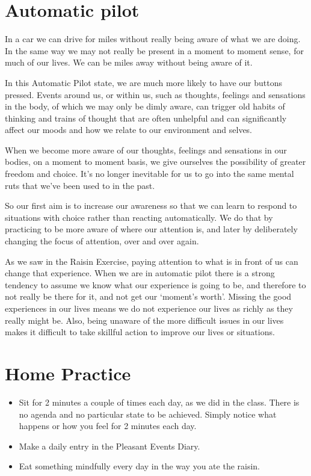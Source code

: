 \documentclass[10pt, twoside, openright, a5paper]{memoir}
\begin{document}
\section{Automatic pilot}

In a car we can drive for miles without really being aware of what we are doing. 
In the same way we may not really be present in a moment to moment sense, 
for much of our lives. 
We can be miles away without being aware of it.

In this Automatic Pilot state, 
we are much more likely to have our buttons pressed. 
Events around us, or within us, 
such as thoughts, feelings and sensations in the body, of which we may only be dimly aware, 
can trigger old habits of thinking and 
trains of thought that are often unhelpful and can significantly affect our moods and how we relate to our environment and selves.

When we become more aware of our thoughts, 
feelings and sensations in our bodies, 
on a moment to moment basis, we give ourselves the possibility of greater freedom and choice. 
It's no longer inevitable for us to go into the same mental ruts that we've been used to in the past.

So our first aim is to increase our awareness so that we can learn to respond to situations with choice rather than reacting automatically. 
We  do that by practicing to be more aware of where our attention is, 
and later by deliberately changing the focus of attention, 
over and over again. 

As we saw in the Raisin Exercise, paying attention to what is in front of us can change that experience.  
When we are in automatic pilot there is a strong tendency to assume we know what our experience is going to be, 
and therefore to not really be there for it, and not get our `moment's worth'.  Missing the good experiences in our lives means we do not experience our lives as richly as they really might be.  Also, being unaware of the more difficult issues in our lives makes it difficult to take skillful action to improve our lives or situations.

\section{Home Practice}

\begin{itemize}
  \item Sit for 2 minutes a couple of times each day, as we did in the class. 
    There is no agenda and no particular state to be achieved. 
    Simply notice what happens or how you feel for 2 minutes each day.
  \item Make a daily entry in the Pleasant Events Diary.
  \item Eat something mindfully every day in the way you ate the raisin.
\end{itemize}
\end{document}
